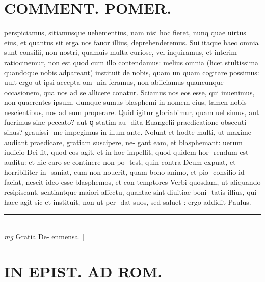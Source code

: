 \documentclass{article}
\begin{document}
\begin{pages}
\section*{COMMENT. POMER.  }\pstart perspiciamus, sitiamusque uehementius, nam nisi hoc fieret, nunq quae uirtus eius, et quantus sit erga nos fauor illius, deprehenderemus. Sui itaque haec omnia sunt consilii, non nostri, quamuis multa curiose, vel inquiramus, et interim ratiocinemur, non est quod cum illo contendamus: melius omnia (licet stultissima quandoque nobis adpareant) instituit de nobis, quam un quam cogitare possimus: uult ergo ut ipsi accepta om- nia feramus, non abiiciamus quancunque occasionem, qua nos ad se allicere conatur. Sciamus nos eos esse, qui inuenimus, non quaerentes ipsum, dumque sumus blasphemi in nomem eius, tamen nobis nescientibus, nos ad eum properare. Quid igitur gloriabimur, quam uel simus, aut fuerimus sine peccato? aut ꝗ statim au- dita Euangelii praedicatione obsecuti sinus? grauissi- me impegimus in illum ante. Nolunt et hodte multi, ut maxime audiant praedicare, gratiam suscipere, ne- gant eam, et blasphemant: uerum iudicio Dei fit, quod eos agit, et in hoc impellit, quod quidem hor- rendum est auditu: et hic caro se continere non po- test, quin contra Deum expuat, et horribiliter in- saniat, cum non nouerit, quam bono animo, et pio- consilio id faciat, nescit ideo esse blasphemos, et con temptores Verbi quosdam, ut aliquando resipiscant, sentiantque maiori affectu, quantae sint diuitiae boni- tatis illius, qui haec agit sic et instituit, non ut per- dat suos, sed saluet : ergo addidit Paulus.  \pend
\vspace{0.5cm}\noindent
\vspace{0.2cm}\rule{1cm}{0.2pt}\\ 
\hspace{0.2cm}\textit{mg}
\footnotesize Gratia De- enmensa. 
\normalsize| 
\section*{IN EPIST. AD ROM.  }
\marginpar{[ p.136 ]}
{}

\end{pages}
\end{document}
